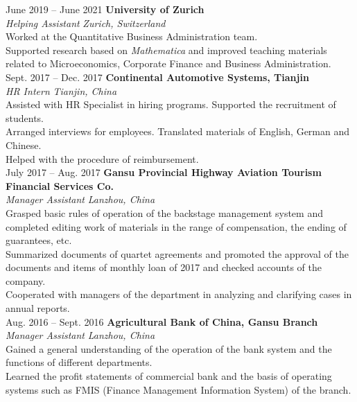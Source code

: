 \documentclass[a4paper,12pt]{article}
\begin{document}
June 2019 -- June 2021 \hfill \textbf{University of Zurich} \\
\textit{Helping Assistant} \hfill \textit{Zurich, Switzerland} \\
\textbullet Worked at the Quantitative Business Administration team. \\
\textbullet Supported research based on \textit{Mathematica} and improved teaching materials related to Microeconomics, Corporate Finance and Business Administration. \\

Sept. 2017 -- Dec. 2017 \hfill \textbf{Continental Automotive Systems, Tianjin} \\
\textit{HR Intern} \hfill \textit{Tianjin, China} \\
\textbullet Assisted with HR Specialist in hiring programs. Supported the recruitment of students. \\
\textbullet Arranged interviews for employees. Translated materials of English, German and Chinese. \\
\textbullet Helped with the procedure of reimbursement. \\

July 2017 -- Aug. 2017 \hfill \textbf{Gansu Provincial Highway Aviation Tourism Financial Services Co.} \\
\textit{Manager Assistant} \hfill \textit{Lanzhou, China} \\
\textbullet Grasped basic rules of operation of the backstage management system and completed editing work of materials in the range of compensation, the ending of guarantees, etc. \\
\textbullet Summarized documents of quartet agreements and promoted the approval of the documents and items of monthly loan of 2017 and checked accounts of the company. \\
\textbullet Cooperated with managers of the department in analyzing and clarifying cases in annual reports. \\

Aug. 2016 -- Sept. 2016 \hfill \textbf{Agricultural Bank of China, Gansu Branch} \\
\textit{Manager Assistant} \hfill \textit{Lanzhou, China} \\
\textbullet Gained a general understanding of the operation of the bank system and the functions of different departments.\\
\textbullet Learned the profit statements of commercial bank and the basis of operating systems such as FMIS (Finance Management Information System) of the branch. \\
\end{document}
